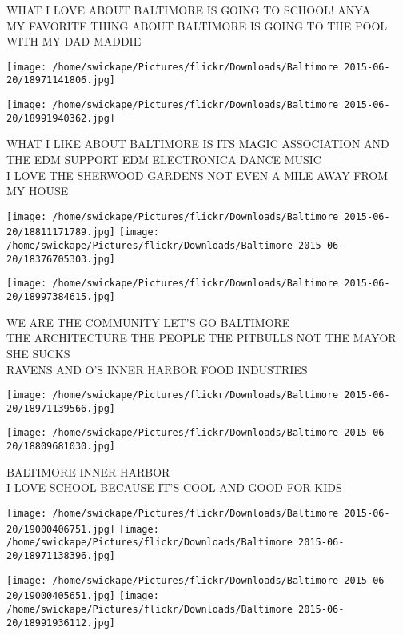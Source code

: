 \documentclass[10pt,letterpaper]{article}
\begin{document}
WHAT I LOVE ABOUT BALTIMORE IS GOING TO SCHOOL!  ANYA\\
MY FAVORITE THING ABOUT BALTIMORE IS GOING TO THE POOL WITH MY DAD MADDIE
\pagebreak

\texttt{[image: /home/swickape/Pictures/flickr/Downloads/Baltimore 2015-06-20/18971141806.jpg]}

\vspace{0.25in}
\texttt{[image: /home/swickape/Pictures/flickr/Downloads/Baltimore 2015-06-20/18991940362.jpg]}

WHAT I LIKE ABOUT BALTIMORE IS ITS MAGIC ASSOCIATION AND THE EDM SUPPORT EDM ELECTRONICA DANCE MUSIC\\
I LOVE THE SHERWOOD GARDENS NOT EVEN A MILE AWAY FROM MY HOUSE
\pagebreak

\texttt{[image: /home/swickape/Pictures/flickr/Downloads/Baltimore 2015-06-20/18811171789.jpg]}
\texttt{[image: /home/swickape/Pictures/flickr/Downloads/Baltimore 2015-06-20/18376705303.jpg]}

\texttt{[image: /home/swickape/Pictures/flickr/Downloads/Baltimore 2015-06-20/18997384615.jpg]}

WE ARE THE COMMUNITY LET'S GO BALTIMORE\\
THE ARCHITECTURE THE PEOPLE THE PITBULLS NOT THE MAYOR SHE SUCKS\\
RAVENS AND O'S INNER HARBOR FOOD INDUSTRIES
\pagebreak

\texttt{[image: /home/swickape/Pictures/flickr/Downloads/Baltimore 2015-06-20/18971139566.jpg]}

\vspace{0.25in}
\texttt{[image: /home/swickape/Pictures/flickr/Downloads/Baltimore 2015-06-20/18809681030.jpg]}

BALTIMORE INNER HARBOR\\
I LOVE SCHOOL BECAUSE IT'S COOL AND GOOD FOR KIDS
\pagebreak

\texttt{[image: /home/swickape/Pictures/flickr/Downloads/Baltimore 2015-06-20/19000406751.jpg]}
\texttt{[image: /home/swickape/Pictures/flickr/Downloads/Baltimore 2015-06-20/18971138396.jpg]}

\texttt{[image: /home/swickape/Pictures/flickr/Downloads/Baltimore 2015-06-20/19000405651.jpg]}
\texttt{[image: /home/swickape/Pictures/flickr/Downloads/Baltimore 2015-06-20/18991936112.jpg]}
\end{document}
